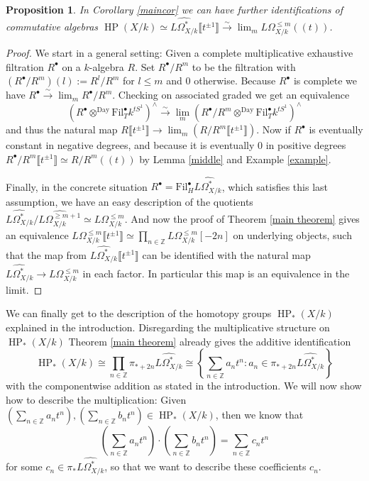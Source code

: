 \documentclass[10pt, reqno]{amsart}
\newtheorem{proposition}[theorem]{Proposition}
\theoremstyle{definition}
\theoremstyle{remark}
\newcommand{\Z}{\mathbb{Z}}
\newcommand{\dr}[3]{\Omega^{#3}_{#1/#2}}
\newcommand{\Fil}{\mathrm{Fil}}
\newcommand{\llrrpar}[1]{(\!(#1)\!)}
\newcommand{\essLaur}{\llbracket t^{\pm1}\rrbracket}
\newcommand{\Day}{\mathrm{Day}}
\DeclareMathOperator{\HP}{\mathrm{HP}}
\begin{document}
\begin{proposition}\label{com}
	In Corollary \ref{maincor} we can have further identifications of commutative algebras $\HP(X/k)\simeq\widehat{L\dr Xk*}\essLaur\xrightarrow\sim\lim_m L\dr Xk{\leq m}\llrrpar t$.
\end{proposition}
\begin{proof} 
	We start in a general setting: Given a complete multiplicative exhaustive filtration $R^\bullet$ on a $k$-algebra $R$. Set $R^\bullet/R^m$ to be the filtration with $(R^\bullet/R^m)(l):= R^l/R^m$ for $l\leq m$ and 0 otherwise. Because $R^\bullet$ is complete we have $R^\bullet\xrightarrow\sim\lim_m R^\bullet/R^m$. Checking on associated graded we get an equivalence
	\[\left(R^\bullet\otimes^\Day\Fil^\bullet_T k^{tS^1}\right)^\wedge\xrightarrow\sim\lim_m\left(R^\bullet/R^m\otimes^\Day\Fil^\bullet_T k^{tS^1}\right)^\wedge\]
	and thus the natural map $R\essLaur \to \lim_m (R/R^m\essLaur)$. Now if $R^\bullet$ is eventually constant in negative degrees, and because it is eventually 0 in positive degrees $R^\bullet/R^m\essLaur\simeq R/R^m\llrrpar t$ by Lemma \ref{middle} and Example \ref{example}.
	
	Finally, in the concrete situation $R^\bullet= \Fil_H^\bullet\widehat{L\dr Xk*}$, which satisfies this last assumption, we have an easy description of the quotients $\widehat{L\dr Xk{*}}/\widehat{L\dr Xk{\geq m+1}}\simeq L\dr Xk{\leq m}$. And now the proof of Theorem \ref{main theorem} gives an equivalence $L\dr Xk{\leq m}\essLaur\simeq \prod_{n\in \Z} L\dr Xk{\leq m}[-2n]$ on underlying objects, such that the map from $\widehat{L\dr Xk{*}}\essLaur$ can be identified with the natural map $\widehat{L\dr Xk{*}}\to L\dr Xk{\leq m}$ in each factor. In particular this map is an equivalence in the limit.
\end{proof}


We can finally get to the description of the homotopy groups $\HP_*(X/k)$ explained in the introduction. Disregarding the multiplicative structure on $\HP_*(X/k)$ Theorem \ref{main theorem} already gives the additive identification
\[\HP_*(X/k)\cong\prod_{n\in\Z}\pi_{*+2n}\widehat{L\dr Xk{*}}\cong\left\{\sum_{n\in\Z} a_nt^n:a_n\in\pi_{*+2n}\widehat{L\dr Xk*} \right\}\]
with the componentwise addition as stated in the introduction. We will now show how to describe the multiplication: Given $\left(\sum_{n\in\Z}a_nt^n\right),\left(\sum_{n\in\Z}b_nt^n\right)\in\HP_*(X/k)$, then we know that
\begin{equation}\label{cn}\left(\sum_{n\in\Z}a_nt^n\right)\cdot\left(\sum_{n\in\Z}b_nt^n\right)=\sum_{n\in\Z}c_nt^n\end{equation}
for some $c_n\in\pi_*\widehat{L\dr Xk*}$, so that we want to describe these coefficients $c_n$.
\end{document}
